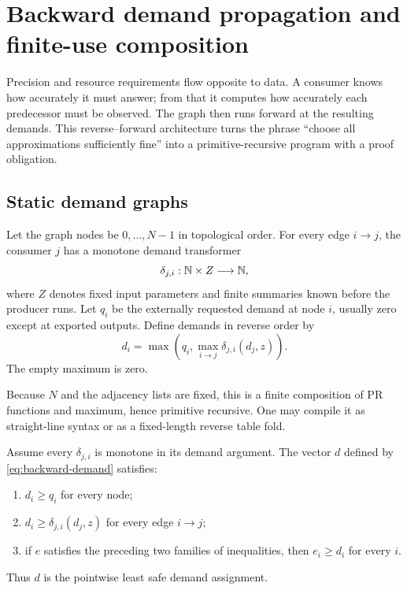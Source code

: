 \section{Backward demand propagation and finite-use composition}
\label{sec:demand}

Precision and resource requirements flow opposite to data.  A consumer knows
how accurately it must answer; from that it computes how accurately each
predecessor must be observed.  The graph then runs forward at the resulting
demands.  This reverse--forward architecture turns the phrase ``choose all
approximations sufficiently fine'' into a primitive-recursive program with a
proof obligation.

\subsection{Static demand graphs}

Let the graph nodes be \(0,\ldots,N-1\) in topological order.  For every edge
\(i\to j\), the consumer \(j\) has a monotone demand transformer
\[
 \delta_{j,i}:\mathbb{N}\times Z\longrightarrow\mathbb{N},
\]
where \(Z\) denotes fixed input parameters and finite summaries known before
the producer runs.  Let \(q_i\) be the externally requested demand at node
\(i\), usually zero except at exported outputs.  Define demands in reverse
order by
\begin{equation}
 d_i=\max\left(q_i,
       \max_{i\to j}\delta_{j,i}(d_j,z)\right).
 \label{eq:backward-demand}
\end{equation}
The empty maximum is zero.

Because \(N\) and the adjacency lists are fixed, this is a finite composition
of PR functions and maximum, hence primitive recursive.  One may compile it
as straight-line syntax or as a fixed-length reverse table fold.

\begin{theorem}
\label{thm:demand-least}
Assume every \(\delta_{j,i}\) is monotone in its demand argument.  The vector
\(d\) defined by \eqref{eq:backward-demand} satisfies:
\begin{enumerate}
\item \(d_i\geq q_i\) for every node;
\item \(d_i\geq\delta_{j,i}(d_j,z)\) for every edge \(i\to j\);
\item if \(e\) satisfies the preceding two families of inequalities, then
\(e_i\geq d_i\) for every \(i\).
\end{enumerate}
Thus \(d\) is the pointwise least safe demand assignment.
\end{theorem}

